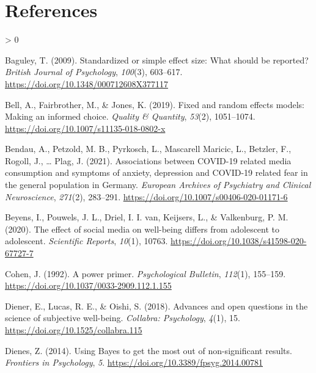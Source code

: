 \documentclass[
  english,
  man,mask,floatsintext]{apa6}
\newlength{\cslhangindent}
\newenvironment{CSLReferences}[2] %
 {%
  \setlength{\parindent}{0pt}
  \ifodd #1 \everypar{\setlength{\hangindent}{\cslhangindent}}\ignorespaces\fi
  \ifnum #2 > 0
  \setlength{\parskip}{#2\baselineskip}
  \fi
 }%
 {}
\begin{document}
\hypertarget{references}{%
\section{References}\label{references}}

\hypertarget{refs}{}
\begin{CSLReferences}{1}{0}
\leavevmode\hypertarget{ref-baguleyStandardizedSimpleEffect2009}{}%
Baguley, T. (2009). Standardized or simple effect size: {What} should be reported? \emph{British Journal of Psychology}, \emph{100}(3), 603--617. \url{https://doi.org/10.1348/000712608X377117}

\leavevmode\hypertarget{ref-bellFixedRandomEffects2019}{}%
Bell, A., Fairbrother, M., \& Jones, K. (2019). Fixed and random effects models: Making an informed choice. \emph{Quality \& Quantity}, \emph{53}(2), 1051--1074. \url{https://doi.org/10.1007/s11135-018-0802-x}

\leavevmode\hypertarget{ref-bendauAssociationsCOVID19Related2021}{}%
Bendau, A., Petzold, M. B., Pyrkosch, L., Mascarell Maricic, L., Betzler, F., Rogoll, J., \ldots{} Plag, J. (2021). Associations between {COVID}-19 related media consumption and symptoms of anxiety, depression and {COVID}-19 related fear in the general population in {Germany}. \emph{European Archives of Psychiatry and Clinical Neuroscience}, \emph{271}(2), 283--291. \url{https://doi.org/10.1007/s00406-020-01171-6}

\leavevmode\hypertarget{ref-beyensEffectSocialMedia2020}{}%
Beyens, I., Pouwels, J. L., Driel, I. I. van, Keijsers, L., \& Valkenburg, P. M. (2020). The effect of social media on well-being differs from adolescent to adolescent. \emph{Scientific Reports}, \emph{10}(1), 10763. \url{https://doi.org/10.1038/s41598-020-67727-7}

\leavevmode\hypertarget{ref-cohenPowerPrimer1992}{}%
Cohen, J. (1992). A power primer. \emph{Psychological Bulletin}, \emph{112}(1), 155--159. \url{https://doi.org/10.1037/0033-2909.112.1.155}

\leavevmode\hypertarget{ref-dienerAdvancesOpenQuestions2018}{}%
Diener, E., Lucas, R. E., \& Oishi, S. (2018). Advances and open questions in the science of subjective well-being. \emph{Collabra: Psychology}, \emph{4}(1), 15. \url{https://doi.org/10.1525/collabra.115}

\leavevmode\hypertarget{ref-dienesUsingBayesGet2014}{}%
Dienes, Z. (2014). Using {Bayes} to get the most out of non-significant results. \emph{Frontiers in Psychology}, \emph{5}. \url{https://doi.org/10.3389/fpsyg.2014.00781}


\end{CSLReferences}
\end{document}
